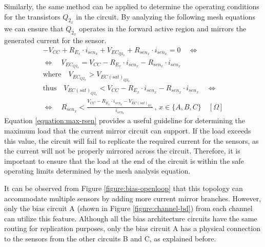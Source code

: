 Similarly, the same method can be applied to determine the operating conditions for the transistors $Q_{2_x}$ in the circuit. By analyzing the following mesh equations we can ensure that $Q_{2_x}$ operates in the forward active region and mirrors the generated current for the sensor.
\vspace{-3mm}
\begin{gather}
    \nonumber -V_{CC} + R_{E_x} \cdot i_{sen_{x}} + V_{EC_{Q2_{x}}} + R_{sen_{x}} \cdot i_{sen_{x}} = 0 \quad \Leftrightarrow \\
    \nonumber \Leftrightarrow \quad V_{EC_{Q2_{x}}} = V_{CC} - R_{E_x} \cdot i_{sen_{x}} - R_{sen_{x}} \cdot i_{sen_{x}} \\
    \nonumber \textrm{where} \quad V_{EC_{Q2_{x}}} > V_{EC(sat)_{Q2_{x}}} \\
    \nonumber \textrm{thus} \quad V_{EC(sat)_{Q2_{x}}} < V_{CC} - R_{E_x} \cdot i_{sen_{x}} - R_{sen_{x}} \cdot i_{sen_{x}} \quad \Leftrightarrow \\
\label{equation:max-rsen}
    \Leftrightarrow \quad R_{sen_{x}} < \frac{ V_{CC} - R_{E_x} \cdot i_{sen_{x}} - V_{EC(sat)_{Q2_{x}}} }{ i_{sen_{x}} } \, , \, x \in \{A, B, C\} \quad [\Omega]
\end{gather}
\noindent
Equation \ref{equation:max-rsen} provides a useful guideline for determining the maximum load that the current mirror circuit can support. If the load exceeds this value, the circuit will fail to replicate the required current for the sensors, as the current will not be properly mirrored across the circuit. Therefore, it is important to ensure that the load at the end of the circuit is within the safe operating limits determined by the mesh analysis equation.

It can be observed from Figure \ref{figure:bias-openloop} that this topology can accommodate multiple sensors by adding more current mirror branches. However, only the bias circuit A (shown in Figure \ref{figure:channel-bd}) from each channel can utilize this feature. Although all the bias architecture circuits have the same routing for replication purposes, only the bias circuit A has a physical connection to the sensors from the other circuits B and C, as explained before.

